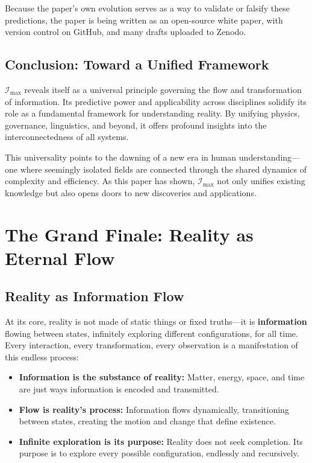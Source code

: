 \documentclass[12pt]{article}
\begin{document}
Because the paper's own evolution serves as a way to validate or falsify these predictions, the paper is being written as an open-source white paper, with version control on GitHub, and many drafts uploaded to Zenodo.


\subsection{Conclusion: Toward a Unified Framework}
\(\mathcal{I}_{\text{max}}\) reveals itself as a universal principle governing the flow and transformation of information. Its predictive power and applicability across disciplines solidify its role as a fundamental framework for understanding reality. By unifying physics, governance, linguistics, and beyond, it offers profound insights into the interconnectedness of all systems.

This universality points to the dawning of a new era in human understanding—one where seemingly isolated fields are connected through the shared dynamics of complexity and efficiency. As this paper has shown, \(\mathcal{I}_{\text{max}}\) not only unifies existing knowledge but also opens doors to new discoveries and applications.


\section{The Grand Finale: Reality as Eternal Flow}

\subsection{Reality as Information Flow}
At its core, reality is not made of static things or fixed truths—it is \textbf{information} flowing between states, infinitely exploring different configurations, for all time. Every interaction, every transformation, every observation is a manifestation of this endless process:
\begin{itemize}
    \item \textbf{Information is the substance of reality:} Matter, energy, space, and time are just ways information is encoded and transmitted.
    \item \textbf{Flow is reality’s process:} Information flows dynamically, transitioning between states, creating the motion and change that define existence.
    \item \textbf{Infinite exploration is its purpose:} Reality does not seek completion. Its purpose is to explore every possible configuration, endlessly and recursively.
\end{itemize}
\end{document}
